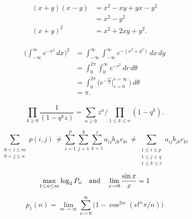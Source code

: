 

\begin{align*}
\begin{aligned}
(x+y)(x-y)&=x^2-xy+yx-y^2\\
&=x^2-y^2\\
(x+y)^2&=x^2+2xy+y^2.
\end{aligned}
\end{align*}


\begin{align*}
\begin{aligned}
\biggl(\int_{-\infty}^\infty e^{-x^2}\,dx\biggr)^2
&=\int_{-\infty}^\infty\int_{-\infty}^\infty e^{-(x^2+y^2)}\,dx\,dy\\
&=\int_0^{2\pi}\int_0^\infty e^{-r^2}\,dr\,d\theta\\
&=\int_0^{2\pi}\biggl(e^{-\frac{r^2}{2}}
\biggl|_{r=0}^{r=\infty}\,\biggr)\,d\theta\\
&=\pi.
\end{aligned}
\end{align*}


\[\prod_{k\ge0}\frac{1}{(1-q^kz)}=
\sum_{n\ge0}z^n\bigg/\!\!\prod_{1\le k\le n}(1-q^k).\]

\[\sum_{\substack{\scriptstyle 0< i\le m\\\scriptstyle0<j\le n}}p(i,j) \,\ne
%
%
\sum_{i=1}^p \sum_{j=1}^q \sum_{k=1}^r a_{ij} b_{jk} c_{ki} \,\ne
%
\sum_{\substack{\scriptstyle 1\le i\le p \\ \scriptstyle 1\le j\le q\\
\scriptstyle 1\le k\le r}} a_{ij} b_{jk} c_{ki}\]

\[\max_{1\le n\le m}\log_2P_n \quad \hbox{and} \quad
\lim_{x\to0}\frac{\sin x}{x}=1\]

\[p_1(n)=\lim_{m\to\infty}\sum_{\nu=0}^\infty\bigl(1-\cos^{2m}(\nu!^n\pi/n)\bigr)\]

